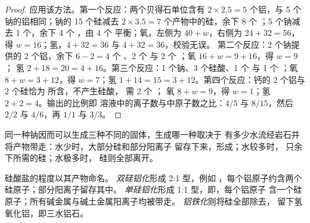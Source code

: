\begin{proof}
应用该方法。第一个反应：两个贝得石单位含有 $2\times2.5 = 5$
个铝，与 5 个钠的铝相同；钠的 15 个硅减去
$2\times3.5 = 7$ 个产物中的硅，余下 8 个 ；5 个钠减去 1 个，余下
4 个 ，由 4 个  平衡；氧，左侧为 $40 + w$，右侧为 $24 + 32 =
56$，得 $w = 16$；氢，$4 + 32 = 36$ 与 $4 + 32 = 36$，校验无误。
第二个反应：2 个钠提供的 2 个铝，余下 $6 - 2 = 4$
个 、2 个  与 2 个 ；氧 $16 + w = 9 + 16$，得 $w = 9$；
氢 $2 + 18 = 20 = 4 + 16$。第三个反应：1 个钠、3 个硅酸、1 个
 与 1 个 ；氧 $8 + w = 3 + 12$，得 $w = 7$；氢
$1 + 14 = 15 = 3 + 12$。第四个反应：钙的 2 个铝与 2 个硅恰为
所含，不产生硅酸， 需 2 个 ；
氧 $8 + w = 9$，得 $w = 1$；氢 $2 + 2 = 4$。输出的比例即
溶液中的离子数与中原子数之比：$4/5$ 与 $8/15$，然后
$2/2$ 与 $4/6$，再 $1/1$ 与 $3/3$。
\end{proof}

同一种钠因而可以生成三种不同的固体，生成哪一种取决于
有多少水流经岩石并将产物带走：水少时，大部分硅和部分阳离子
留存下来，形成；水较多时，
只余下所需的硅；水极多时，
硅则全部离开。

\begin{definition}\label{def:b1:weathering-clays:hydrolysis-degree}
硅酸盐的程度以其产物命名。
\emph{双硅铝化}形成 2:1 型，例如
，每个铝原子约含两个硅原子；部分阳离子留存其中。
\emph{单硅铝化}形成 1:1 型，即，每个铝原子
含一个硅原子；所有碱金属与碱土金属阳离子均被带走。
\emph{铝铁化}则将硅全部除去，
留下氢氧化铝，即三水铝石。
\end{definition}


